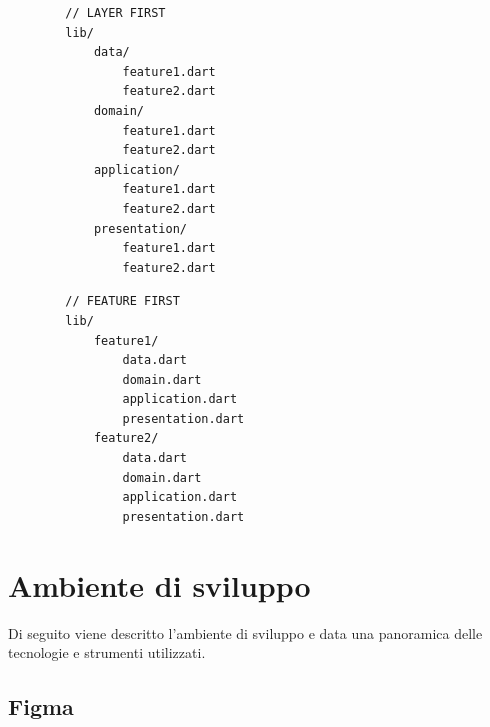 \newpage

\begin{multicols}{2}
    \begin{verbatim}
        // LAYER FIRST
        lib/
            data/
                feature1.dart
                feature2.dart
            domain/
                feature1.dart
                feature2.dart
            application/
                feature1.dart
                feature2.dart
            presentation/
                feature1.dart
                feature2.dart
    \end{verbatim}
    \begin{verbatim}
        // FEATURE FIRST
        lib/
            feature1/
                data.dart
                domain.dart
                application.dart
                presentation.dart
            feature2/
                data.dart
                domain.dart
                application.dart
                presentation.dart
    \end{verbatim}
\end{multicols}




\section{Ambiente di sviluppo}
\label{sec:ambiente-sviluppo}
Di seguito viene descritto l'ambiente di sviluppo e data una panoramica delle tecnologie e strumenti utilizzati.

\subsection*{Figma}
\label{subsec:figma}

